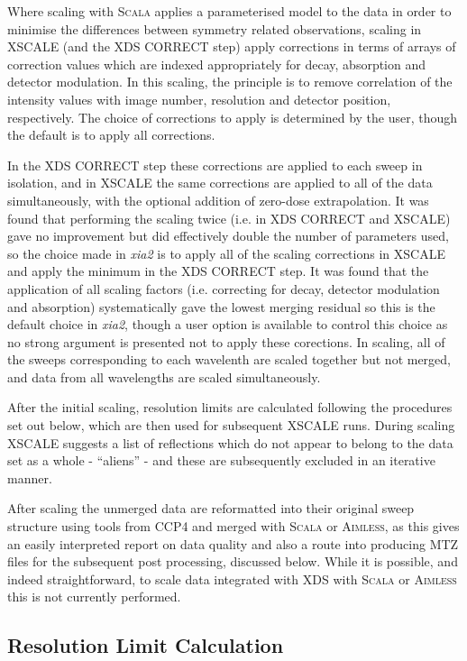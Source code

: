 \documentclass[a4paper, 11pt]{article}
\begin{document}
Where scaling with \textsc{Scala} applies a parameterised model to the data
in order to minimise the differences between symmetry related
observations, scaling in XSCALE (and the XDS CORRECT step) apply
corrections in terms of arrays of correction values which are indexed
appropriately for decay, absorption and detector modulation. In this
scaling, the principle is to remove correlation of the intensity values
with image number, resolution and detector position, 
respectively. The choice of corrections to apply
is determined by the user, though the default is to apply all corrections.

In the XDS CORRECT step these corrections are applied to each sweep in
isolation, and in XSCALE the same corrections are applied to all of the
data simultaneously, with the optional addition of zero-dose extrapolation. 
It was found that performing the scaling twice (i.e. in XDS CORRECT
and XSCALE)
gave no improvement but did effectively double the number of
parameters used, so the choice made in \emph{xia2} is to apply all of
the scaling corrections in XSCALE and apply the minimum in the XDS
CORRECT step. It was found that the application of all scaling factors
(i.e. correcting for decay, detector modulation and absorption)
systematically gave the lowest merging residual so this is the
default choice in \emph{xia2}, though a user option is available to
control this choice as no strong argument is presented not to apply
these corections. In scaling, all of the sweeps corresponding to
each wavelenth are scaled together but not merged, and
data from all wavelengths are scaled simultaneously. 

After the initial scaling, resolution limits are calculated
following the procedures set out below, which are then used for subsequent
XSCALE runs. During scaling XSCALE suggests a
list of reflections which do not appear to belong to the data set as a
whole - ``aliens'' - and these are subsequently excluded in an iterative manner.

After scaling the unmerged data are reformatted into their original
sweep structure using tools from CCP4
and merged with \textsc{Scala} or \textsc{Aimless}, as this gives an
easily interpreted report on data quality and also a route into
producing MTZ files for the subsequent post processing, discussed
below. While it is possible, and indeed straightforward, to scale data
integrated with XDS with \textsc{Scala} or \textsc{Aimless} this is
not currently performed.

\subsection{Resolution Limit Calculation}
\end{document}
